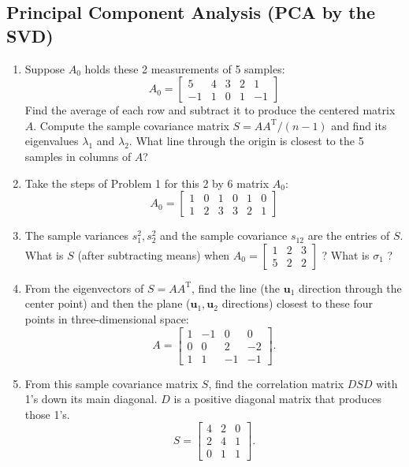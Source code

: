 \documentclass[14pt, a4paper]{article}
\begin{document}
\subsection{Principal Component Analysis (PCA by the SVD)}
\begin{enumerate}
    \item Suppose $A_0$ holds these 2 measurements of 5 samples:
          \[
              A_0 = \begin{bmatrix} 5 & 4 & 3 & 2 & 1 \\ -1 & 1 & 0 & 1 & -1 \end{bmatrix}
          \]
          Find the average of each row and subtract it to produce the centered matrix $A$. Compute the sample covariance matrix $S = AA^{\mathrm{T}}/(n - 1)$ and find its eigenvalues $\lambda_1$ and $\lambda_2$. What line through the origin is closest to the 5 samples in columns of $A$?

    \item Take the steps of Problem 1 for this 2 by 6 matrix $A_0$:
          \[
              A_0 = \begin{bmatrix} 1 & 0 & 1 & 0 & 1 & 0 \\ 1 & 2 & 3 & 3 & 2 & 1 \end{bmatrix}
          \]

    \item The sample variances $s_1^2, s_2^2$ and the sample covariance $s_{12}$ are the entries of $S$. What is $S$ (after subtracting means) when $A_0 = \begin{bmatrix} 1 & 2 & 3 \\ 5 & 2 & 2 \end{bmatrix}$ ? What is $\sigma_1$ ?

    \item From the eigenvectors of $S = AA^{\mathrm{T}}$, find the line (the $\boldsymbol{u}_1$ direction through the center point) and then the plane ($\boldsymbol{u}_1, \boldsymbol{u}_2$ directions) closest to these four points in three-dimensional space:
          \[
              A = \begin{bmatrix} 1 & -1 & 0 & 0 \\ 0 & 0 & 2 & -2 \\ 1 & 1 & -1 & -1 \end{bmatrix}.
          \]

    \item From this sample covariance matrix $S$, find the correlation matrix $DSD$ with 1's down its main diagonal. $D$ is a positive diagonal matrix that produces those 1's.
          \[
              S = \begin{bmatrix} 4 & 2 & 0 \\ 2 & 4 & 1 \\ 0 & 1 & 1 \end{bmatrix}.
          \]


\end{enumerate}
\end{document}
